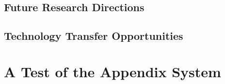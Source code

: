 \documentclass{erauthesis}
\begin{document}
\section{Future Research Directions}

\section{Technology Transfer Opportunities}





% 


\backmatter

\chapter{A Test of the Appendix System}


\end{document}

